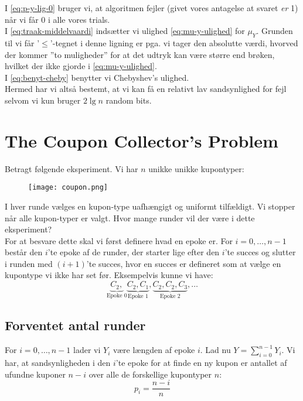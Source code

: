 I \cref{eq:p-y-lig-0} bruger vi, at algoritmen fejler (givet vores antagelse at svaret \emph{er} 1) når vi får 0 i alle vores trials.\\
I \cref{eq:traak-middelvaardi} indsætter vi ulighed \cref{eq:mu-y-ulighed} for $\mu_Y$. Grunden til vi får '$\leq$'-tegnet i denne ligning er pga. vi tager den absolutte værdi, hvorved der kommer ''to muligheder'' for at det udtryk kan være større end brøken, hvilket der ikke gjorde i \cref{eq:mu-y-ulighed}.\\
I \cref{eq:benyt-cheby} benytter vi Chebyshev's ulighed.\\

Hermed har vi altså bestemt, at vi kan få en relativt lav sandsynlighed for fejl selvom vi kun bruger $2 \lg n$ random bits.







\newpage
\section{The Coupon Collector's Problem}
Betragt følgende eksperiment. Vi har $n$ unikke unikke kupontyper:
\begin{figure}[H]
  \begin{center}
  \texttt{[image: coupon.png]}
  \end{center}
  \label{fig:coupon}
\end{figure}

I hver runde vælges en kupon-type uafhængigt og uniformt tilfældigt. Vi stopper når alle kupon-typer er valgt. Hvor mange runder vil der være i dette eksperiment?\\

For at besvare dette skal vi først definere hvad en epoke er. For $i = 0, \dots, n-1$ består den $i$'te epoke af de runder, der starter lige efter den $i$'te succes og slutter i runden med $(i+1)$'te succes, hvor en succes er defineret som at vælge en kupontype vi ikke har set før. Eksempelvis kunne vi have:
$$
  \underbrace{C_2,}_{\text{Epoke 0}} \underbrace{C_2, C_1}_{\text{Epoke 1}}, \underbrace{C_2, C_2, C_3}_{\text{Epoke 2}}, \dots
$$


\subsection{Forventet antal runder}
For $i = 0, \dots, n-1$ lader vi $Y_i$ være længden af epoke $i$. Lad nu $Y = \sum_{i=0}^{n-1} Y_{i}$. Vi har, at sandsynligheden i den $i$'te epoke for at finde en ny kupon er antallet af ufundne kuponer $n-i$ over alle de forskellige kupontyper $n$:
$$
  p_i = \frac{n-i}{n}
$$

